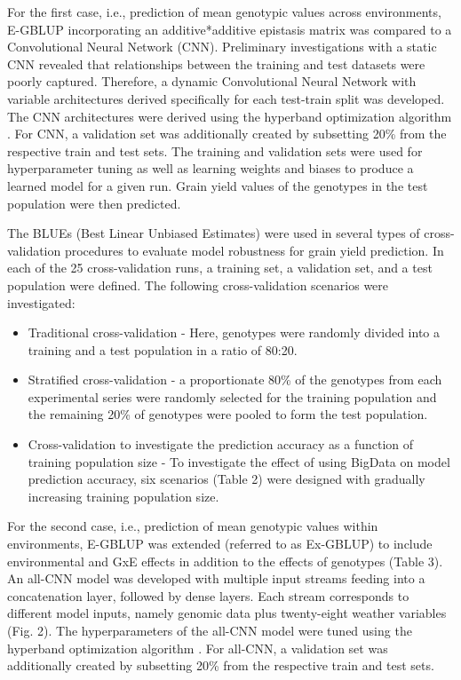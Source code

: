 \documentclass[english, biblatex]{lni}
\begin{document}
For the first case, i.e., prediction of mean genotypic values across environments, E-GBLUP incorporating an additive*additive epistasis matrix \cite{jiang2015modeling} was compared to a Convolutional Neural Network (CNN). Preliminary investigations with a static CNN revealed that relationships between the training and test datasets were poorly captured. Therefore, a dynamic Convolutional Neural Network with variable architectures derived specifically for each test-train split was developed. The CNN architectures were derived using the hyperband optimization algorithm \cite{li_hyperband_2018}. For CNN, a validation set was additionally created by subsetting 20\% from the respective train and test sets. The training and validation sets were used for hyperparameter tuning as well as learning weights and biases to produce a learned model for a given run. Grain yield values of the genotypes in the test population were then predicted.

The BLUEs (Best Linear Unbiased Estimates) were used in several types of cross-validation procedures to evaluate model robustness for grain yield prediction. In each of the 25 cross-validation runs, a training set, a validation set, and a test population were defined. The following cross-validation scenarios were investigated:

\begin{itemize}
    \item Traditional cross-validation - Here, genotypes were randomly divided into a training and a test population in a ratio of 80:20.
    \item Stratified cross-validation - a proportionate 80\% of the genotypes from each experimental series were randomly selected for the training population and the remaining 20\% of genotypes were pooled to form the test population.
    \item Cross-validation to investigate the prediction accuracy as a function of training population size - To investigate the effect of using BigData on model prediction accuracy, six scenarios (Table 2) were designed with gradually increasing training population size. 
\end{itemize}

For the second case, i.e., prediction of mean genotypic values within environments, E-GBLUP was extended (referred to as Ex-GBLUP) to include environmental and GxE effects in addition to the effects of genotypes (Table 3). An all-CNN model was developed with multiple input streams feeding into a concatenation layer, followed by dense layers. Each stream corresponds to different model inputs, namely genomic data plus twenty-eight weather variables (Fig. 2). The hyperparameters of the all-CNN model were tuned using the hyperband optimization algorithm \cite{li_hyperband_2018}. For all-CNN, a validation set was additionally created by subsetting 20\% from the respective train and test sets. 
\end{document}
